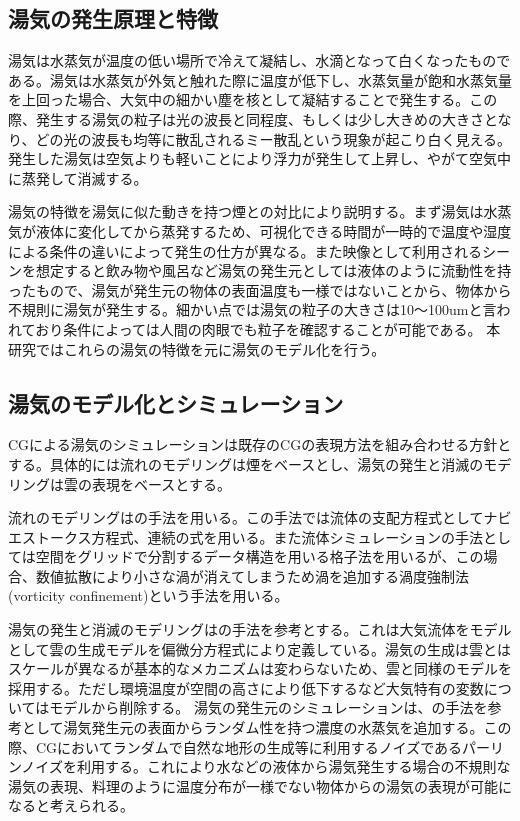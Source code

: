 \subsection{湯気の発生原理と特徴}
湯気は水蒸気が温度の低い場所で冷えて凝結し、水滴となって白くなったものである。湯気は水蒸気が外気と触れた際に温度が低下し、水蒸気量が飽和水蒸気量を上回った場合、大気中の細かい塵を核として凝結することで発生する。この際、発生する湯気の粒子は光の波長と同程度、もしくは少し大きめの大きさとなり、どの光の波長も均等に散乱されるミー散乱という現象が起こり白く見える。発生した湯気は空気よりも軽いことにより浮力が発生して上昇し、やがて空気中に蒸発して消滅する。

湯気の特徴を湯気に似た動きを持つ煙との対比により説明する。まず湯気は水蒸気が液体に変化してから蒸発するため、可視化できる時間が一時的で温度や湿度による条件の違いによって発生の仕方が異なる。また映像として利用されるシーンを想定すると飲み物や風呂など湯気の発生元としては液体のように流動性を持ったもので、湯気が発生元の物体の表面温度も一様ではないことから、物体から不規則に湯気が発生する。細かい点では湯気の粒子の大きさは10〜100umと言われており条件によっては人間の肉眼でも粒子を確認することが可能である。
本研究ではこれらの湯気の特徴を元に湯気のモデル化を行う。

\subsection{湯気のモデル化とシミュレーション}
CGによる湯気のシミュレーションは既存のCGの表現方法を組み合わせる方針とする。具体的には流れのモデリングは煙をベースとし、湯気の発生と消滅のモデリングは雲の表現をベースとする。

流れのモデリングは\cite{Stam1999}\cite{Fedkiw2001}の手法を用いる。この手法では流体の支配方程式としてナビエストークス方程式、連続の式を用いる。また流体シミュレーションの手法としては空間をグリッドで分割するデータ構造を用いる格子法を用いるが、この場合、数値拡散により小さな渦が消えてしまうため渦を追加する渦度強制法(vorticity confinement)という手法を用いる。

湯気の発生と消滅のモデリングは\cite{Miyazaki2002}の手法を参考とする。これは大気流体をモデルとして雲の生成モデルを偏微分方程式により定義している。湯気の生成は雲とはスケールが異なるが基本的なメカニズムは変わらないため、雲と同様のモデルを採用する。ただし環境温度が空間の高さにより低下するなど大気特有の変数についてはモデルから削除する。
湯気の発生元のシミュレーションは、\cite{Miyazaki2001}の手法を参考として湯気発生元の表面からランダム性を持つ濃度の水蒸気を追加する。この際、CGにおいてランダムで自然な地形の生成等に利用するノイズであるパーリンノイズを利用する。これにより水などの液体から湯気発生する場合の不規則な湯気の表現、料理のように温度分布が一様でない物体からの湯気の表現が可能になると考えられる。

